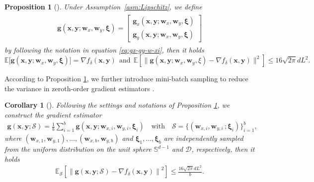 \documentclass[11pt]{article}
\def\vg{\mathbf{g}}
\def\vw{\mathbf{w}}
\def\vx{\mathbf{x}}
\def\vy{\mathbf{y}}
\def\vxi{\bm{\xi}}
\def\fD{{\mathcal{D}}}
\def\fS{{\mathcal{S}}}
\def\BS{{\mathbb{S}}}
\newtheorem{proposition}{Proposition}
\newtheorem{corollary}[theorem]{Corollary}
\begin{document}
\begin{proposition}[{\citet[Lemma D.1]{lin2022gradient}}]\label{prop:g-unbiased-variance}
Under Assumption~\ref{asm:Lipschitz}, we define
\begin{align}\label{eq:g-w-xi}
\begin{split}    
    \vg(\vx,\vy;\vw_x,\vw_y,\vxi) = \begin{bmatrix}
        \vg_x(\vx,\vy;\vw_x,\vw_y,\vxi)  \\
        \vg_y(\vx,\vy;\vw_x,\vw_y,\vxi) 
    \end{bmatrix}
\end{split}
\end{align}
by following the notation in equation \eqref{eq:gx-gy-w-xi}, 
then it holds
\[
\mathbb{E}
\big[ \vg(\vx,\vy;\vw_x,\vw_y,\vxi) \big]
= \nabla f_\delta(\vx,\vy) 
~~\text{and}~~
\mathbb{E}
\left[\big\|
\vg(\vx,\vy;\vw_x,\vw_y,\xi)
- \nabla f_\delta(\vx,\vy)
\big\|^2\right]
\le 16\sqrt{2\pi}d L^2.
\]
\end{proposition}
According to Proposition \ref{prop:g-unbiased-variance}, we further introduce mini-batch sampling to reduce the variance in zeroth-order gradient estimators \citep{chen2023faster}.
\begin{corollary}[{\citet[Corollary 1]{chen2023faster}}]\label{Variance of the estimator}
Following the settings and notations of Proposition \ref{prop:g-unbiased-variance}, we construct the gradient estimator 
\begin{align}\label{eq:g-unbiased-variance}
\vg(\vx,\vy; \fS) = \frac{1}{b} \sum_{i=1}^b \vg(\vx,\vy;\vw_{x,i},\vw_{y,i},\vxi_i) 
\quad\text{with}\quad
\fS = \{(\vw_{x,i},\vw_{y,i}\,;\vxi_i)\}_{i=1}^b,
\end{align}
where $(\vw_{x,1},\vw_{y,1}),\dots,(\vw_{x,b},\vw_{y,b})$ and $\vxi_1,\dots,\vxi_b$ are independently sampled from the uniform distribution on the unit sphere $\BS^{d-1}$ and $\fD$, respectively,
then it holds
\begin{align*}
\mathbb{E}_\fS \left[\left\| \vg(\vx,\vy; \fS) - \nabla f_\delta(\vx,\vy) \right\|^2\right] \leq \frac{16 \sqrt{2\pi} d L^2}{b}.    
\end{align*}
\end{corollary}
\end{document}
